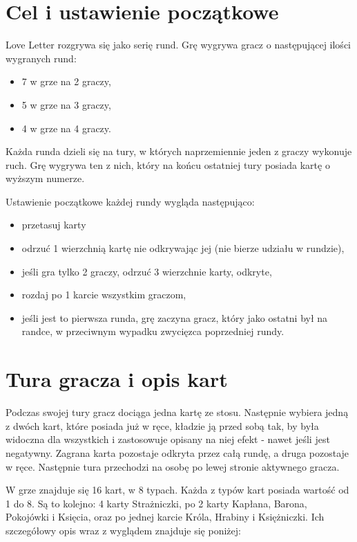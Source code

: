 \section*{Cel i ustawienie początkowe}
\label{sec:celIUstawieniePoczatkowe}
Love Letter rozgrywa się jako serię rund. Grę wygrywa gracz o następującej ilości wygranych rund:
\begin{itemize}
	\item 7 w grze na 2 graczy,
	\item 5 w grze na 3 graczy,
	\item 4 w grze na 4 graczy.
\end{itemize}
Każda runda dzieli się na tury, w których naprzemiennie jeden z graczy wykonuje ruch. Grę wygrywa ten z nich, który na końcu ostatniej tury posiada kartę o wyższym numerze.

Ustawienie początkowe każdej rundy wygląda następująco:
\begin{itemize}
	\item przetasuj karty
	\item odrzuć 1 wierzchnią kartę nie odkrywając jej (nie bierze udziału w rundzie),
	\item jeśli gra tylko 2 graczy, odrzuć 3 wierzchnie karty, odkryte,
	\item rozdaj po 1 karcie wszystkim graczom,
	\item jeśli jest to pierwsza runda, grę zaczyna gracz, który jako ostatni był na randce, w przeciwnym wypadku zwycięzca poprzedniej rundy.
\end{itemize}

\section*{Tura gracza i opis kart}
\label{sec:turaGracza}
Podczas swojej tury gracz dociąga jedna kartę ze stosu. Następnie wybiera jedną z dwóch kart, które posiada już w ręce, kładzie ją przed sobą tak, by była widoczna dla wszystkich i zastosowuje opisany na niej efekt - nawet jeśli jest negatywny. Zagrana karta pozostaje odkryta przez całą rundę, a druga pozostaje w ręce. Następnie tura przechodzi na osobę po lewej stronie aktywnego gracza.

W grze znajduje się 16 kart, w 8 typach. Każda z typów kart posiada wartość od 1 do 8. Są to kolejno: 4 karty Strażniczki, po 2 karty Kapłana, Barona, Pokojówki i Księcia, oraz po jednej karcie Króla, Hrabiny i Księżniczki. Ich szczegółowy opis wraz z wyglądem znajduje się poniżej:

